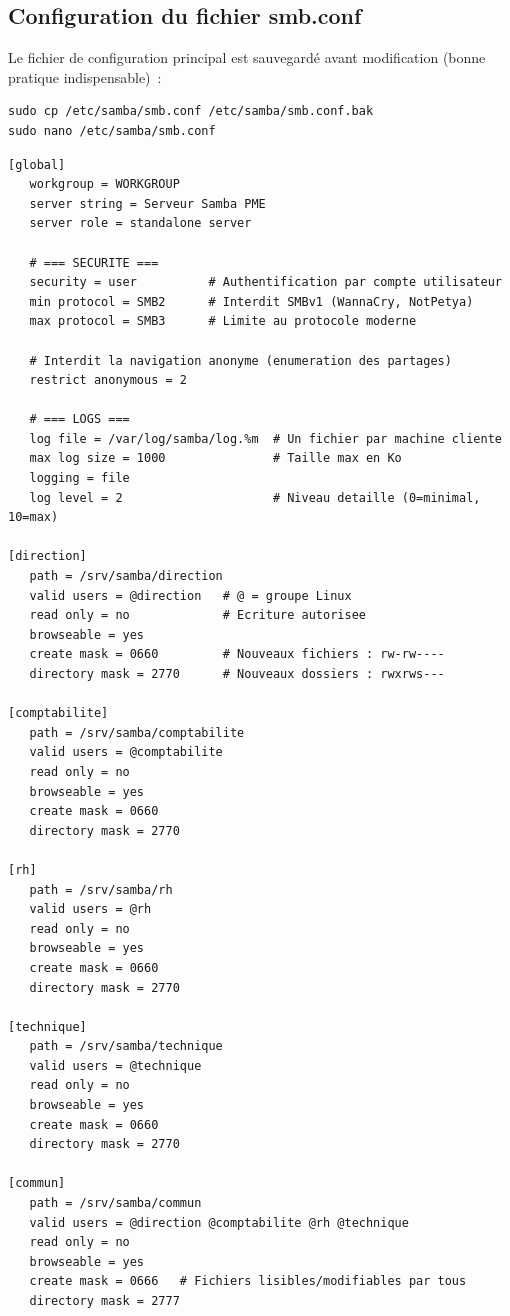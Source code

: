 \documentclass[12pt,a4paper]{article}
\begin{document}
\subsection{Configuration du fichier smb.conf}

Le fichier de configuration principal est sauvegardé avant modification (bonne pratique
indispensable)~:

\begin{lstlisting}[style=terminal]
sudo cp /etc/samba/smb.conf /etc/samba/smb.conf.bak
sudo nano /etc/samba/smb.conf
\end{lstlisting}

\begin{lstlisting}[style=config, caption={/etc/samba/smb.conf -- configuration complète}]
[global]
   workgroup = WORKGROUP
   server string = Serveur Samba PME
   server role = standalone server

   # === SECURITE ===
   security = user          # Authentification par compte utilisateur
   min protocol = SMB2      # Interdit SMBv1 (WannaCry, NotPetya)
   max protocol = SMB3      # Limite au protocole moderne

   # Interdit la navigation anonyme (enumeration des partages)
   restrict anonymous = 2

   # === LOGS ===
   log file = /var/log/samba/log.%m  # Un fichier par machine cliente
   max log size = 1000               # Taille max en Ko
   logging = file
   log level = 2                     # Niveau detaille (0=minimal, 10=max)

[direction]
   path = /srv/samba/direction
   valid users = @direction   # @ = groupe Linux
   read only = no             # Ecriture autorisee
   browseable = yes
   create mask = 0660         # Nouveaux fichiers : rw-rw----
   directory mask = 2770      # Nouveaux dossiers : rwxrws---

[comptabilite]
   path = /srv/samba/comptabilite
   valid users = @comptabilite
   read only = no
   browseable = yes
   create mask = 0660
   directory mask = 2770

[rh]
   path = /srv/samba/rh
   valid users = @rh
   read only = no
   browseable = yes
   create mask = 0660
   directory mask = 2770

[technique]
   path = /srv/samba/technique
   valid users = @technique
   read only = no
   browseable = yes
   create mask = 0660
   directory mask = 2770

[commun]
   path = /srv/samba/commun
   valid users = @direction @comptabilite @rh @technique
   read only = no
   browseable = yes
   create mask = 0666   # Fichiers lisibles/modifiables par tous
   directory mask = 2777
\end{lstlisting}
\end{document}
